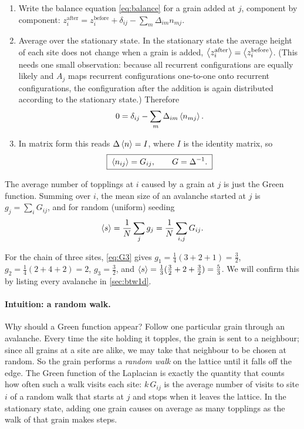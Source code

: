 \begin{enumerate}
  \item Write the balance equation \cref{eq:balance} for a grain added at $j$, component by component:
    $z_i^{\text{after}} = z_i^{\text{before}} + \delta_{ij} - \sum_m \Delta_{im} n_{mj}$.
  \item Average over the stationary state. In the stationary state the average height of each site does not change
    when a grain is added, $\left\langle z_i^{\text{after}} \right\rangle = \left\langle z_i^{\text{before}} \right\rangle$. (This needs one small observation:
    because all recurrent configurations are equally likely and $A_j$ maps recurrent configurations one-to-one onto
    recurrent configurations, the configuration after the addition is again distributed according to the stationary
    state.) Therefore
    \begin{equation}
      0 = \delta_{ij} - \sum_m \Delta_{im}\left\langle n_{mj} \right\rangle .
    \end{equation}
  \item In matrix form this reads $\Delta\left\langle n \right\rangle = I$, where $I$ is the identity matrix, so
    \begin{equation}
      \boxed{\;\left\langle n_{ij} \right\rangle = G_{ij},\qquad G=\Delta^{-1}.\;}
      \label{eq:nG}
    \end{equation}
\end{enumerate}
The average number of topplings at $i$ caused by a grain at $j$ is just the Green function. Summing over $i$, the mean
size of an avalanche started at $j$ is $g_j = \sum_i G_{ij}$, and for random (uniform) seeding
\begin{equation}
  \left\langle s \right\rangle = \frac1N\sum_{j} g_j = \frac1N\sum_{i,j} G_{ij}.
  \label{eq:mean-s}
\end{equation}

\begin{example}
For the chain of three sites, \cref{eq:G3} gives $g_1 = \tfrac14(3+2+1)=\tfrac32$, $g_2 = \tfrac14(2+4+2)=2$,
$g_3=\tfrac32$, and $\left\langle s \right\rangle = \tfrac13(\tfrac32+2+\tfrac32)=\tfrac53$. We will confirm this by listing every avalanche
in \cref{sec:btw1d}.
\end{example}

\paragraph{Intuition: a random walk.} Why should a Green function appear? Follow one particular grain through an
avalanche. Every time the site holding it topples, the grain is sent to a neighbour; since all grains at a site are
alike, we may take that neighbour to be chosen at random. So the grain performs a \emph{random walk} on the lattice
until it falls off the edge. The Green function of the Laplacian is exactly the quantity that counts how often such a
walk visits each site: $k\,G_{ij}$ is the average number of visits to site $i$ of a random walk that starts at $j$ and
stops when it leaves the lattice. In the stationary state, adding one grain causes on average as many topplings as the
walk of that grain makes steps.

